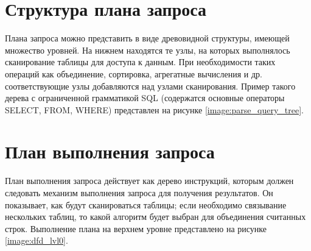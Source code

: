 \section{Структура плана запроса}
\vspace{-0.5cm}
Плана запроса можно представить в виде древовидной структуры, имеющей множество уровней. На нижнем находятся те узлы, на которых выполнялось сканирование таблицы для доступа к данным. При необходимости таких операций как объединение, сортировка, агрегатные вычисления и др. соответствующие узлы добавляются над узлами сканирования. Пример такого дерева с ограниченной грамматикой SQL (содержатся основные операторы SELECT, FROM, WHERE) представлен на рисунке \ref{image:parse_query_tree}.

\begin{figure}[H]
	\captionsetup{justification=centering}
\end{figure}

\section{План выполнения запроса}
\vspace{-0.5cm}
План выполнения запроса действует как дерево инструкций, которым должен следовать механизм выполнения запроса для получения результатов. Он показывает, как будут сканироваться таблицы; если необходимо связывание нескольких таблиц, то какой алгоритм будет выбран для объединения считанных строк. Выполнение плана на верхнем уровне представлено на рисунке \ref{image:dfd_lvl0}.

\begin{figure}[H]
\end{figure}

